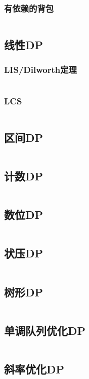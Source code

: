 \documentclass[a4paper,12pt]{article}
\begin{document}
\subsubsection{有依赖的背包}
\inputminted[breaklines, linenos]{c++}{dp/bag/dep.cc}

\subsection{线性DP}
\subsubsection{LIS/Dilworth定理}
\inputminted[breaklines, linenos]{c++}{dp/linear/lis.cc}
\subsubsection{LCS}
\inputminted[breaklines, linenos]{c++}{dp/linear/lcs.cc}
\subsection{区间DP}
\inputminted[breaklines, linenos]{c++}{dp/interval.cc}
\subsection{计数DP}
\inputminted[breaklines, linenos]{c++}{dp/jishu.cc}
\subsection{数位DP}
\inputminted[breaklines, linenos]{c++}{dp/shuwei.cc}
\subsection{状压DP}
\inputminted[breaklines, linenos]{c++}{dp/zhuangya.cc}
\subsection{树形DP}
\inputminted[breaklines, linenos]{c++}{dp/treedp.cc}
\subsection{单调队列优化DP}
\inputminted[breaklines, linenos]{c++}{dp/dddl.cc}
\subsection{斜率优化DP}
\inputminted[breaklines, linenos]{c++}{dp/xielv.cc}
\end{document}
